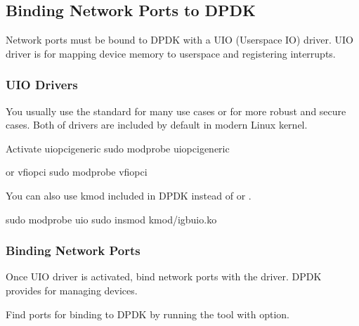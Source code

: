 \documentclass[a4paper,11pt,openany,oneside,english]{sphinxmanual}
\begin{document}
\subsection{Binding Network Ports to DPDK}
\label{\detokenize{gsg/install:binding-network-ports-to-dpdk}}
Network ports must be bound to DPDK with a UIO (Userspace IO) driver.
UIO driver is for mapping device memory to userspace and registering
interrupts.


\subsubsection{UIO Drivers}
\label{\detokenize{gsg/install:uio-drivers}}
You usually use the standard  for many use cases
or  for more robust and secure cases.
Both of drivers are included by default in modern Linux kernel.

\begin{sphinxVerbatim}[commandchars=\\\{\},formatcom=\footnotesize]
 Activate uio\PYGZus{}pci\PYGZus{}generic
 sudo modprobe uio\PYGZus{}pci\PYGZus{}generic

 or vfio\PYGZhy{}pci
 sudo modprobe vfio\PYGZhy{}pci
\end{sphinxVerbatim}

You can also use kmod included in DPDK instead of 
or .

\begin{sphinxVerbatim}[commandchars=\\\{\},formatcom=\footnotesize]
 sudo modprobe uio
 sudo insmod kmod/igb\PYGZus{}uio.ko
\end{sphinxVerbatim}


\subsubsection{Binding Network Ports}
\label{\detokenize{gsg/install:binding-network-ports}}
Once UIO driver is activated, bind network ports with the driver.
DPDK provides  for managing devices.

Find ports for binding to DPDK by running the tool with  option.
\end{document}
